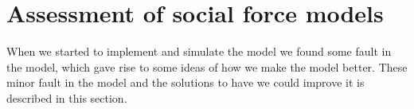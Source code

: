 \section{Assessment of social force models}
\label{sec:assessment}
When we started to implement and simulate the model we found some fault
in the model, which gave rise to some ideas of how we make the model better.
These minor fault in the model and the solutions to have we could improve it
is described in this section.

% 
% 
% 
% 
% 
